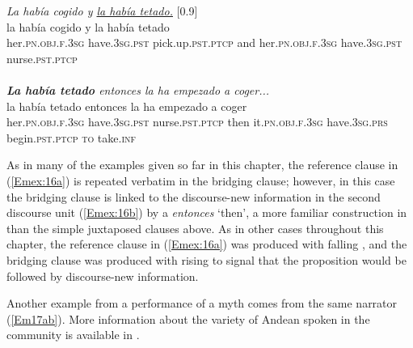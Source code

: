 \documentclass[output=paper]{LSP/langsci}
\begin{document}
\begin{exe}
\ex \label{Em16ab}
\begin{xlist}
\ex \label{Emex:16a}
\glt \textit{La había cogido y  \underline{la había tetado.}} [0.9]\\
\gll la había cogido y la había tetado\\
 her\textsc{.pn.obj.f.3sg} have\textsc{.3sg.pst} pick.up\textsc{.pst.ptcp} and her\textsc{.pn.obj.f.3sg} have\textsc{.3sg.pst} nurse\textsc{.pst.ptcp}\\
\glt {}\\
\ex \label{Emex:16b}
\glt \textit{\textbf{La había tetado} entonces la ha empezado a coger...}\\
\gll la había tetado entonces la ha empezado a coger\\     	      
    her\textsc{.pn.obj.f.3sg} have\textsc{.3sg.pst} nurse\textsc{.pst.ptcp} then it\textsc{.pn.obj.f.3sg} have\textsc{.3sg.prs} begin\textsc{.pst.ptcp} \textsc{to} take\textsc{.inf}\\
\glt {}
\end{xlist}
\end{exe}


%
As in many of the examples given so far in this chapter, the reference clause in (\ref{Emex:16a}) is repeated verbatim in the bridging clause; however, in this case the bridging clause is linked to the discourse-new information in the second discourse unit (\ref{Emex:16b}) by a  \textit{entonces} `then', a more familiar construction in  than the simple juxtaposed clauses above. As in other cases throughout this chapter, the reference clause in (\ref{Emex:16a}) was produced with falling , and the bridging clause was produced with rising  to signal that the proposition would be followed by discourse-new information.


Another example from a  performance of a  myth comes from the same narrator (\ref{Em17ab}). More information about the variety of Andean  spoken in the community is available in \citet{emlenforth}.\largerpage
\largerpage
\end{document}
